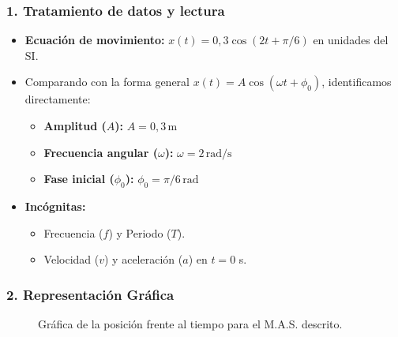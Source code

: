 \subsubsection*{1. Tratamiento de datos y lectura}
\begin{itemize}
    \item \textbf{Ecuación de movimiento:} $x(t) = 0,3 \cos(2t + \pi/6)$ en unidades del SI.
    \item Comparando con la forma general $x(t) = A \cos(\omega t + \phi_0)$, identificamos directamente:
        \begin{itemize}
            \item \textbf{Amplitud ($A$):} $A = 0,3 \, \text{m}$
            \item \textbf{Frecuencia angular ($\omega$):} $\omega = 2 \, \text{rad/s}$
            \item \textbf{Fase inicial ($\phi_0$):} $\phi_0 = \pi/6 \, \text{rad}$
        \end{itemize}
    \item \textbf{Incógnitas:}
        \begin{itemize}
            \item Frecuencia ($f$) y Periodo ($T$).
            \item Velocidad ($v$) y aceleración ($a$) en $t=0$ s.
        \end{itemize}
\end{itemize}

\subsubsection*{2. Representación Gráfica}
\begin{figure}[H]
    \centering
    \caption{Gráfica de la posición frente al tiempo para el M.A.S. descrito.}
\end{figure}

